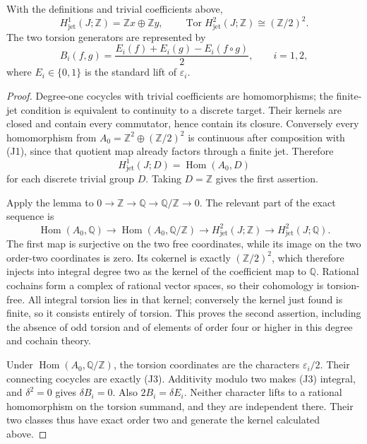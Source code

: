 \begin{proposition}\ours{}
With the definitions and trivial coefficients above,
\[
 H^1_{\mathrm{jet}}(J;\mathbb Z)=\mathbb Zx\oplus\mathbb Zy,
 \qquad
 \operatorname{Tor}H^2_{\mathrm{jet}}(J;\mathbb Z)
       \cong(\mathbb Z/2)^2.                 \tag{J2}
\]
The two torsion generators are represented by
\[
 B_i(f,g)=\frac{E_i(f)+E_i(g)-E_i(f\circ g)}2,
 \qquad i=1,2,                             \tag{J3}
\]
where \(E_i\in\{0,1\}\) is the standard lift of \(\varepsilon_i\).
\end{proposition}
\begin{proof}
Degree-one cocycles with trivial coefficients are homomorphisms; the
finite-jet condition is equivalent to continuity to a discrete target.
Their kernels are closed and contain every commutator, hence contain its
closure. Conversely every homomorphism from
\(A_0=\mathbb Z^2\oplus(\mathbb Z/2)^2\) is continuous after composition
with (J1), since that quotient map already factors through a finite jet.
Therefore
\[
 H^1_{\mathrm{jet}}(J;D)=\operatorname{Hom}(A_0,D)
\]
for each discrete trivial group \(D\). Taking \(D=\mathbb Z\) gives the
first assertion.

Apply the lemma to \(0\to\mathbb Z\to\mathbb Q\to\mathbb Q/\mathbb Z\to0\).
The relevant part of the exact sequence is
\[
 \operatorname{Hom}(A_0,\mathbb Q)\longrightarrow
 \operatorname{Hom}(A_0,\mathbb Q/\mathbb Z)\longrightarrow
 H^2_{\mathrm{jet}}(J;\mathbb Z)\longrightarrow
 H^2_{\mathrm{jet}}(J;\mathbb Q).
\]
The first map is surjective on the two free coordinates, while its image
on the two order-two coordinates is zero. Its cokernel is exactly
\((\mathbb Z/2)^2\), which therefore injects into integral degree two as
the kernel of the coefficient map to \(\mathbb Q\). Rational cochains
form a complex of rational vector spaces, so their cohomology is
torsion-free. All integral torsion lies in that kernel; conversely the
kernel just found is finite, so it consists entirely of torsion. This
proves the second assertion, including the absence of odd torsion and of
elements of order four or higher in this degree and cochain theory.

Under \(\operatorname{Hom}(A_0,\mathbb Q/\mathbb Z)\), the torsion
coordinates are the characters \(\varepsilon_i/2\). Their connecting
cocycles are exactly (J3). Additivity modulo two makes (J3) integral, and
\(\delta^2=0\) gives \(\delta B_i=0\). Also \(2B_i=\delta E_i\).
Neither character lifts to a rational homomorphism on the torsion summand,
and they are independent there. Their two classes thus have exact order
two and generate the kernel calculated above.
\end{proof}

